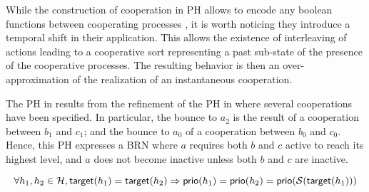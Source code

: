 While the construction of cooperation in PH allows to encode any boolean functions
between cooperating processes \cite{PMR10-TCSB}, it is worth noticing they introduce a temporal
shift in their application.
This allows the existence of interleaving of actions leading to a cooperative sort representing a
past sub-state of the presence of the cooperative processes.
The resulting behavior is then an over-approximation
of the realization of an instantaneous cooperation.

\begin{example*}
The PH in  results from the refinement of the PH in 
where several cooperations have been specified.
In particular, the bounce to $a_2$ is the result of a cooperation between $b_1$ and $c_1$; and the
bounce to $a_0$ of a cooperation between $b_0$ and $c_0$.
Hence, this PH expresses a BRN where $a$ requires both $b$ and $c$ active to reach its
highest level, and $a$ does not become inactive unless both $b$ and $c$ are inactive.
\end{example*}



$$\forall h_1, h_2 \in \mathcal{H}, \mathsf{target}(h_1) = \mathsf{target}(h_2) \Rightarrow \mathsf{prio}(h_1) = \mathsf{prio}(h_2) = \mathsf{prio}(\mathcal{S}(\mathsf{target}(h_1)))$$

